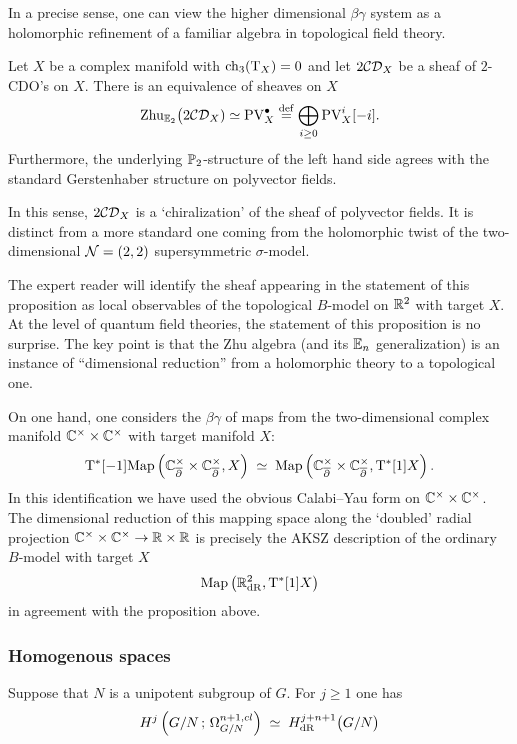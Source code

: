\documentclass[11pt]{amsart}
\def\CDO{{\cC\cD}}
\begin{document}
In a precise sense, one can view the higher dimensional $\beta\gamma$ system as a holomorphic refinement of a familiar algebra in topological field theory.

\begin{prop}
Let $X$ be a complex manifold with ${\rm ch}_{3}({\rm T}_X) = 0$ and let $2\CDO_X$ be a sheaf of $2$-CDO's on $X$. 
There is an equivalence of sheaves on $X$
\[
{\rm Zhu}_{\EE_2} \big(2\CDO_X) \simeq {\rm PV}^{\bu}_X \define \bigoplus_{i\geq 0} {\rm PV}^i_X [-i] .
\]
Furthermore, the underlying $\mathbb P_2$-structure of the left hand side agrees with the standard Gerstenhaber structure on polyvector fields.
\end{prop}

\begin{rmk}
In this sense, $2\CDO_X$ is a `chiralization' of the sheaf of polyvector fields.
It is distinct from a more standard one coming from the holomorphic twist of the two-dimensional $\mathcal N=(2,2)$ supersymmetric $\sigma$-model.
\end{rmk}

The expert reader will identify the sheaf appearing in the statement of this proposition as local observables of the topological $B$-model on $\mathbb R^2$ with target $X$. 
At the level of quantum field theories, the statement of this proposition is no surprise. 
The key point is that the Zhu algebra (and its $\mathbb E_n$ generalization) is an instance of ``dimensional reduction'' from a holomorphic theory to a topological one. 

On one hand, one considers the $\beta\gamma$ of maps from the two-dimensional complex manifold $\mathbb C^\times \times \mathbb C^\times$ with target manifold $X$:
\[
{\rm T}^*[-1] {\rm Map}\left(\mathbb C_{\overline{\partial}}^\times \times \mathbb C_{\overline{\partial}}^\times , X\right) \; \simeq \; {\rm Map}\left(\mathbb C_{\overline{\partial}}^\times \times \mathbb C_{\overline{\partial}}^\times , {\rm T}^*[1] X\right) .
\]
In this identification we have used the obvious Calabi--Yau form on $\mathbb C^\times \times \mathbb C^\times$. 
The dimensional reduction of this mapping space along the `doubled' radial projection $\mathbb C^\times \times \mathbb C^\times \to \mathbb R \times \mathbb R$ is precisely the AKSZ description of the ordinary $B$-model with target $X$
\[
{\rm Map}\left(\mathbb R^2_{\rm dR} , {\rm T}^*[1] X\right)
\]
in agreement with the proposition above.


\subsubsection{Homogenous spaces}

Suppose that $N$ is a unipotent subgroup of $G$.
For $j \geq 1$ one has
\[
H^j \left( G / N \, ; \, \Omega^{n+1,cl}_{G/N} \right) \; \simeq \; H_{\rm dR}^{j+n+1} \big(G / N \big)
\]
\end{document}
